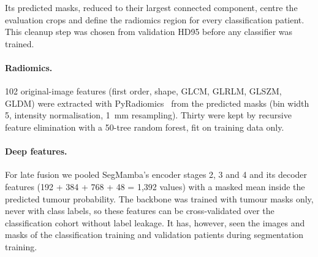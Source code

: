 \documentclass[11pt]{article}
\begin{document}
Its predicted masks, reduced to their largest connected component, centre the evaluation crops and define the
radiomics region for every classification patient. This cleanup step was chosen from validation HD95 before any
classifier was trained.

\paragraph{Radiomics.} 102 original-image features (first order, shape, GLCM, GLRLM, GLSZM, GLDM) were extracted with
PyRadiomics~\cite{vangriethuysen2017pyradiomics} from the predicted masks (bin width 5, intensity normalisation,
1~mm resampling). Thirty were kept by recursive feature elimination with a 50-tree random forest, fit on training data
only.

\paragraph{Deep features.} For late fusion we pooled SegMamba's encoder stages 2, 3 and 4 and its decoder features
(192 + 384 + 768 + 48 = 1,392 values) with a masked mean inside the predicted tumour probability. The backbone was
trained with tumour masks only, never with class labels, so these features can be cross-validated over the
classification cohort without label leakage. It has, however, seen the images and masks of the classification
training and validation patients during segmentation training.
\end{document}
